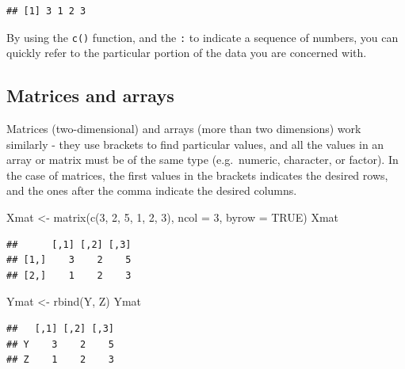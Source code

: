 \documentclass[
]{book}
\newenvironment{Shaded}{\begin{snugshade}}{\end{snugshade}}
\newcommand{\AttributeTok}[1]{\textcolor[rgb]{0.77,0.63,0.00}{#1}}
\newcommand{\ConstantTok}[1]{\textcolor[rgb]{0.00,0.00,0.00}{#1}}
\newcommand{\DecValTok}[1]{\textcolor[rgb]{0.00,0.00,0.81}{#1}}
\newcommand{\FunctionTok}[1]{\textcolor[rgb]{0.00,0.00,0.00}{#1}}
\newcommand{\NormalTok}[1]{#1}
\newcommand{\OtherTok}[1]{\textcolor[rgb]{0.56,0.35,0.01}{#1}}
\begin{document}
\begin{verbatim}
## [1] 3 1 2 3
\end{verbatim}

By using the \texttt{c()} function, and the \texttt{:} to indicate a sequence of numbers, you can quickly refer to the particular portion of the data you are concerned with.

\hypertarget{matrices-and-arrays}{%
\subsection*{Matrices and arrays}\label{matrices-and-arrays}}

Matrices (two-dimensional) and arrays (more than two dimensions) work similarly - they use brackets to find particular values, and all the values in an array or matrix must be of the same type (e.g.~numeric, character, or factor). In the case of matrices, the first values in the brackets indicates the desired rows, and the ones after the comma indicate the desired columns.

\begin{Shaded}
\begin{Highlighting}[]
\NormalTok{Xmat }\OtherTok{\textless{}{-}} \FunctionTok{matrix}\NormalTok{(}\FunctionTok{c}\NormalTok{(}\DecValTok{3}\NormalTok{, }\DecValTok{2}\NormalTok{, }\DecValTok{5}\NormalTok{, }\DecValTok{1}\NormalTok{, }\DecValTok{2}\NormalTok{, }\DecValTok{3}\NormalTok{), }
               \AttributeTok{ncol =} \DecValTok{3}\NormalTok{, }\AttributeTok{byrow =} \ConstantTok{TRUE}\NormalTok{)}
\NormalTok{Xmat}
\end{Highlighting}
\end{Shaded}

\begin{verbatim}
##      [,1] [,2] [,3]
## [1,]    3    2    5
## [2,]    1    2    3
\end{verbatim}

\begin{Shaded}
\begin{Highlighting}[]
\NormalTok{Ymat }\OtherTok{\textless{}{-}} \FunctionTok{rbind}\NormalTok{(Y, Z)}
\NormalTok{Ymat}
\end{Highlighting}
\end{Shaded}

\begin{verbatim}
##   [,1] [,2] [,3]
## Y    3    2    5
## Z    1    2    3
\end{verbatim}
\end{document}
